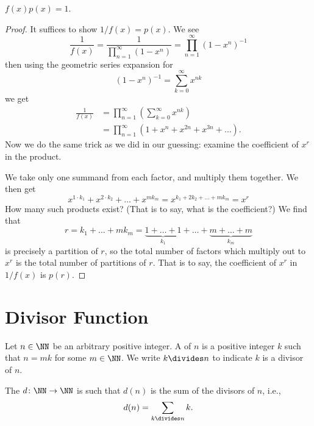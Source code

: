 \documentclass{article}
\begin{document}
 $f(x)p(x)=1$.

\begin{proof}
It suffices to show $1/f(x)=p(x)$. We see
\begin{equation}
  \frac{1}{f(x)} = \frac{1}{\prod^{\infty}_{n=1}(1-x^{n})} = \prod^{\infty}_{n=1}(1 - x^{n})^{-1}
\end{equation}
then using the geometric series expansion for
\begin{equation}
  (1 - x^{n})^{-1} = \sum^{\infty}_{k=0}x^{nk}
\end{equation}
we get
\begin{equation}
  \begin{split}
  \frac{1}{f(x)} &= \prod^{\infty}_{n=1}\left(\sum^{\infty}_{k=0}x^{nk}\right)\\
  &= \prod^{\infty}_{n=1}\left(1 + x^{n} + x^{2n} + x^{3n} + \dots\right).
  \end{split}
\end{equation}
Now we do the same trick as we did in our guessing: examine the
coefficient of $x^{r}$ in the product.

We take only one summand from each factor, and multiply them
together. We then get
\begin{equation}
  x^{1\cdot k_{1}} + x^{2\cdot k_{2}} + \dots + x^{m k_{m}} = x^{k_{1} + 2k_{2} + \dots + m k_{m}} = x^{r}
\end{equation}
How many such products exist? (That is to say, what is the coefficient?)
We find that
\begin{equation}
  r = k_{1} + \dots + mk_{m} = \underbrace{1+\dots+1}_{k_{1}} + \dots + \underbrace{m+\dots+m}_{k_{m}}
\end{equation}
is precisely a partition of $r$, so the total number of factors which
multiply out to $x^{r}$ is the total number of partitions of $r$. That
is to say, the coefficient of $x^{r}$ in $1/f(x)$ is $p(r)$.
\end{proof}

\section{Divisor Function}

Let $n\in\NN$ be an arbitrary positive integer. A  of
$n$ is a positive integer $k$ such that $n = mk$ for some $m\in\NN$. We
write $k\divides n$ to indicate $k$ is a divisor of $n$.

The  $d\colon\NN\to\NN$ is such that $d(n)$ is
the sum of the divisors of $n$, i.e., 
\begin{equation}
  d(n) = \sum_{k\divides n}k.
\end{equation}
\end{document}
